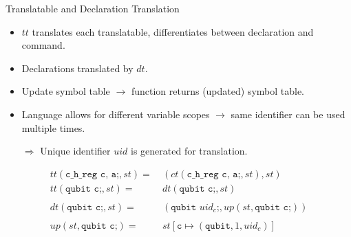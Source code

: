 \begin{frame}{Translatable and Declaration Translation}
    \begin{itemize}
        \item $tt$ translates each translatable, differentiates between declaration and command.
        \item Declarations translated by $dt$. 
        \item Update symbol table $\to$ function returns (updated) symbol table.
        \item Language allows for different variable scopes $\to$ same identifier can be used multiple times.
        \item[$\Rightarrow$] Unique identifier $uid$ is generated for translation. 
    \end{itemize}
    \LARGE
    \begin{align*}
        tt(\texttt{c\_h\_reg c, a;}, st) =& \ (ct(\texttt{c\_h\_reg c, a;}, st), st)\\
        tt(\texttt{qubit c;}, st) =& \ dt(\texttt{qubit c;}, st)\\
        &\\
        dt(\texttt{qubit c;}, st) =& \ (\texttt{qubit } uid_c \texttt{;}, up(st, \texttt{qubit c;}))\\
        &\\
        up(st, \texttt{qubit c;}) =& \ st[\texttt{c} \mapsto (\texttt{qubit}, 1, uid_c)]
    \end{align*}
\end{frame}

